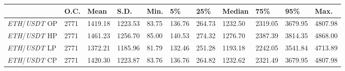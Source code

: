\begin{tabular}{lllllllllll}
\toprule
 & \textbf{O.C.} & \textbf{Mean} & \textbf{S.D.} & \textbf{Min.} & \textbf{5\%} & \textbf{25\%} & \textbf{Median} & \textbf{75\%} & \textbf{95\%} & \textbf{Max.} \\
\midrule
\emph{ETH}/\emph{USDT} OP & 2771 & 1419.18 & 1223.53 & 83.75 & 136.76 & 264.73 & 1232.50 & 2319.05 & 3679.95 & 4807.98 \\
\emph{ETH}/\emph{USDT} HP & 2771 & 1461.23 & 1256.70 & 85.00 & 140.53 & 274.32 & 1276.70 & 2387.39 & 3814.35 & 4868.00 \\
\emph{ETH}/\emph{USDT} LP & 2771 & 1372.21 & 1185.96 & 81.79 & 132.46 & 251.28 & 1193.18 & 2242.05 & 3541.84 & 4713.89 \\
\emph{ETH}/\emph{USDT} CP & 2771 & 1420.30 & 1223.87 & 83.76 & 136.76 & 264.82 & 1232.62 & 2321.49 & 3679.95 & 4807.98 \\
\bottomrule
\end{tabular}
